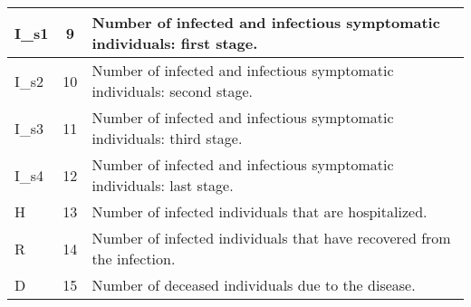 \begin{table}[tb!]
{\begin{tabular}{|l|c|p{9.25cm}|}
            \hline
            I\_s1       & 9                & Number of infected and infectious symptomatic individuals: first stage.                                     \\
            \hline
            I\_s2       & 10               & Number of infected and infectious symptomatic individuals: second stage.                                    \\
            \hline
            I\_s3       & 11               & Number of infected and infectious symptomatic individuals: third stage.                                     \\
            \hline
            I\_s4       & 12               & Number of infected and infectious symptomatic individuals: last stage.                                      \\
            \hline
            H           & 13               & Number of infected individuals that are hospitalized.                                                       \\
            \hline
            R           & 14               & Number of infected individuals that have recovered from the infection.                                      \\
            \hline
            D           & 15               & Number of deceased individuals due to the disease.                                                          \\
            \hline
        \end{tabular}%
    }
\end{table}

\begin{table}[tb!]
    \centering
    \caption{Description of output parameters of the simulation model.}
    \label{tab:outparams}
\end{table}

